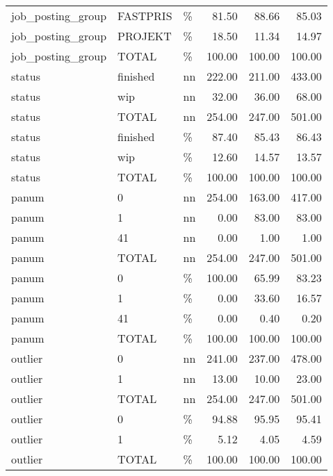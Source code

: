 \begin{longtable}[t]{lllrrr}
job\_posting\_group & FASTPRIS & \% & 81.50 & 88.66 & 85.03\\
job\_posting\_group & PROJEKT & \% & 18.50 & 11.34 & 14.97\\
job\_posting\_group & TOTAL & \% & 100.00 & 100.00 & 100.00\\
status & finished & nn & 222.00 & 211.00 & 433.00\\
status & wip & nn & 32.00 & 36.00 & 68.00\\
status & TOTAL & nn & 254.00 & 247.00 & 501.00\\
status & finished & \% & 87.40 & 85.43 & 86.43\\
status & wip & \% & 12.60 & 14.57 & 13.57\\
status & TOTAL & \% & 100.00 & 100.00 & 100.00\\
panum & 0 & nn & 254.00 & 163.00 & 417.00\\
panum & 1 & nn & 0.00 & 83.00 & 83.00\\
panum & 41 & nn & 0.00 & 1.00 & 1.00\\
panum & TOTAL & nn & 254.00 & 247.00 & 501.00\\
panum & 0 & \% & 100.00 & 65.99 & 83.23\\
panum & 1 & \% & 0.00 & 33.60 & 16.57\\
panum & 41 & \% & 0.00 & 0.40 & 0.20\\
panum & TOTAL & \% & 100.00 & 100.00 & 100.00\\
outlier & 0 & nn & 241.00 & 237.00 & 478.00\\
outlier & 1 & nn & 13.00 & 10.00 & 23.00\\
outlier & TOTAL & nn & 254.00 & 247.00 & 501.00\\
outlier & 0 & \% & 94.88 & 95.95 & 95.41\\
outlier & 1 & \% & 5.12 & 4.05 & 4.59\\
outlier & TOTAL & \% & 100.00 & 100.00 & 100.00\\*
\end{longtable}
\endgroup{}
